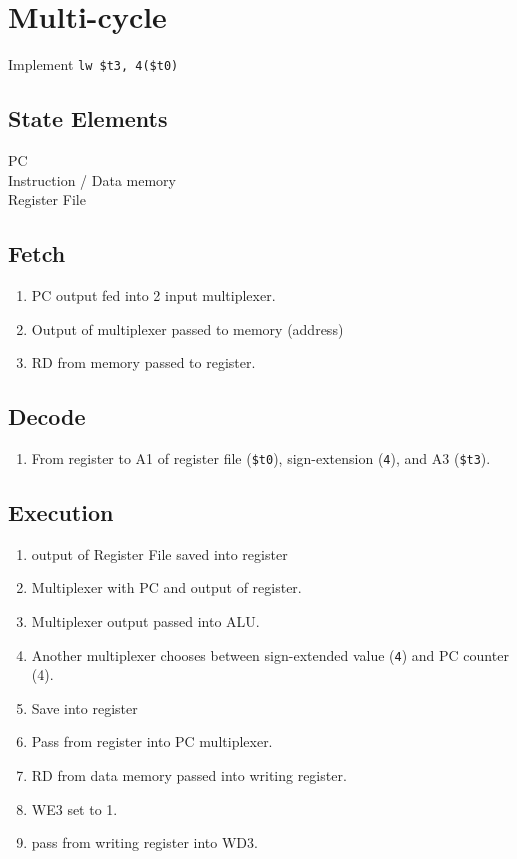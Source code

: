 \documentclass[a4paper]{article}
\begin{document}
	\section{Multi-cycle}
	Implement \verb|lw $t3, 4($t0)|
	\subsection{State Elements}
	PC\\
	Instruction / Data memory\\
	Register File

	\subsection{Fetch}
	\begin{enumerate}
		\item PC output fed into 2 input multiplexer.
		\item Output of multiplexer passed to memory (address)
		\item RD from memory passed to register.
	\end{enumerate}

	\subsection{Decode}
	\begin{enumerate}
		\item From register to A1 of register file (\verb|$t0|),
			sign-extension (\verb|4|), and A3 (\verb|$t3|).
	\end{enumerate}

	\subsection{Execution}
	\begin{enumerate}
		\item output of Register File saved into register
		\item Multiplexer with PC and output of register.
		\item Multiplexer output passed into ALU.
		\item Another multiplexer chooses between sign-extended value (\verb|4|) and PC counter (4).
		\item Save into register
		\item Pass from register into PC multiplexer.
		\item RD from data memory passed into writing register.
		\item WE3 set to 1.
		\item pass from writing register into WD3.
	\end{enumerate}
	
\end{document}
